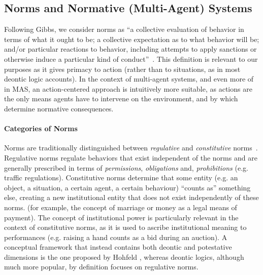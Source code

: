 \subsection{Norms and Normative (Multi-Agent) Systems}
\label{sec:back:norms}
Following Gibbs, we consider norms as ``a collective evaluation of behavior in terms of what it ought to be; a collective expectation as to what behavior will be; and/or particular reactions to behavior, including attempts to apply sanctions or otherwise induce a particular kind of conduct''~\cite{Gibbs1965Norms:Classification.}. This definition is relevant to our purposes as it gives primacy to action (rather than to situations, as in most deontic logic accounts). In the context of multi-agent systems, and even more of in MAS, an action-centered approach is intuitively more suitable, as actions are the only means agents have to intervene on the environment, and by which determine normative consequences.


\paragraph{Categories of Norms}
Norms are traditionally distinguished between \textit{regulative} and \textit{constitutive} norms~\cite{Searle1969,Boella2004RegulativeSystems,Sileno2015}.
%
Regulative norms regulate behaviors that exist independent of the norms and are generally prescribed in terms of \textit{permissions}, \textit{obligations} and, \textit{prohibitions} (e.g. traffic regulations).
%
Constitutive norms determine that some entity (e.g. an object, a situation, a certain agent, a certain behaviour) ``counts as'' something else, creating a new institutional entity that does not exist independently of these norms. (for example, the concept of marriage or money as a legal means of payment). The concept of institutional power is particularly relevant in the context of constitutive norms, as it is used to ascribe institutional meaning to  performances (e.g. raising a hand counts as a bid during an auction). A conceptual framework that instead contains both deontic and potestative dimensions is the one proposed by Hohfeld \cite{hohfeld1917fundamental}, whereas deontic logics, although much more popular, by definition focuses on regulative norms.

